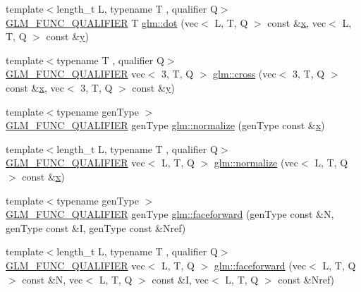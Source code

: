 \begin{DoxyCompactItemize}
\item 
{\footnotesize template$<$length\+\_\+t L, typename T , qualifier Q$>$ }\\\mbox{\hyperlink{setup_8hpp_a33fdea6f91c5f834105f7415e2a64407}{G\+L\+M\+\_\+\+F\+U\+N\+C\+\_\+\+Q\+U\+A\+L\+I\+F\+I\+ER}} T \mbox{\hyperlink{group__core__func__geometric_gaad6c5d9d39bdc0bf43baf1b22e147a0a}{glm\+::dot}} (vec$<$ L, T, Q $>$ const \&\mbox{\hyperlink{_s_d_l__opengl_8h_ad0e63d0edcdbd3d79554076bf309fd47}{x}}, vec$<$ L, T, Q $>$ const \&\mbox{\hyperlink{_s_d_l__opengl_8h_a1675d9d7bb68e1657ff028643b4037e3}{y}})
\item 
{\footnotesize template$<$typename T , qualifier Q$>$ }\\\mbox{\hyperlink{setup_8hpp_a33fdea6f91c5f834105f7415e2a64407}{G\+L\+M\+\_\+\+F\+U\+N\+C\+\_\+\+Q\+U\+A\+L\+I\+F\+I\+ER}} vec$<$ 3, T, Q $>$ \mbox{\hyperlink{group__core__func__geometric_gaeeec0794212fe84fc9d261de067c9587}{glm\+::cross}} (vec$<$ 3, T, Q $>$ const \&\mbox{\hyperlink{_s_d_l__opengl_8h_ad0e63d0edcdbd3d79554076bf309fd47}{x}}, vec$<$ 3, T, Q $>$ const \&\mbox{\hyperlink{_s_d_l__opengl_8h_a1675d9d7bb68e1657ff028643b4037e3}{y}})
\item 
{\footnotesize template$<$typename gen\+Type $>$ }\\\mbox{\hyperlink{setup_8hpp_a33fdea6f91c5f834105f7415e2a64407}{G\+L\+M\+\_\+\+F\+U\+N\+C\+\_\+\+Q\+U\+A\+L\+I\+F\+I\+ER}} gen\+Type \mbox{\hyperlink{namespaceglm_a213a489b64d438c533ea56f4cb2d2426}{glm\+::normalize}} (gen\+Type const \&\mbox{\hyperlink{_s_d_l__opengl_8h_ad0e63d0edcdbd3d79554076bf309fd47}{x}})
\item 
{\footnotesize template$<$length\+\_\+t L, typename T , qualifier Q$>$ }\\\mbox{\hyperlink{setup_8hpp_a33fdea6f91c5f834105f7415e2a64407}{G\+L\+M\+\_\+\+F\+U\+N\+C\+\_\+\+Q\+U\+A\+L\+I\+F\+I\+ER}} vec$<$ L, T, Q $>$ \mbox{\hyperlink{group__core__func__geometric_ga3b8d3dcae77870781392ed2902cce597}{glm\+::normalize}} (vec$<$ L, T, Q $>$ const \&\mbox{\hyperlink{_s_d_l__opengl_8h_ad0e63d0edcdbd3d79554076bf309fd47}{x}})
\item 
{\footnotesize template$<$typename gen\+Type $>$ }\\\mbox{\hyperlink{setup_8hpp_a33fdea6f91c5f834105f7415e2a64407}{G\+L\+M\+\_\+\+F\+U\+N\+C\+\_\+\+Q\+U\+A\+L\+I\+F\+I\+ER}} gen\+Type \mbox{\hyperlink{namespaceglm_ad32c7f0f9f0ca45467adbb4a1db5184d}{glm\+::faceforward}} (gen\+Type const \&N, gen\+Type const \&I, gen\+Type const \&Nref)
\item 
{\footnotesize template$<$length\+\_\+t L, typename T , qualifier Q$>$ }\\\mbox{\hyperlink{setup_8hpp_a33fdea6f91c5f834105f7415e2a64407}{G\+L\+M\+\_\+\+F\+U\+N\+C\+\_\+\+Q\+U\+A\+L\+I\+F\+I\+ER}} vec$<$ L, T, Q $>$ \mbox{\hyperlink{group__core__func__geometric_ga7aed0a36c738169402404a3a5d54e43b}{glm\+::faceforward}} (vec$<$ L, T, Q $>$ const \&N, vec$<$ L, T, Q $>$ const \&I, vec$<$ L, T, Q $>$ const \&Nref)

\end{DoxyCompactItemize}
